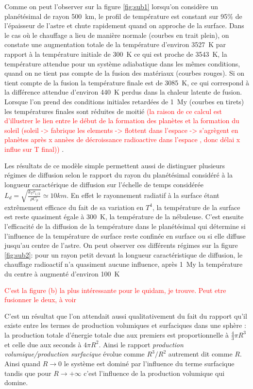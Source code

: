 \documentclass[10pt,a4paper]{article}
\numberwithin{equation}{section}
\begin{document}
Comme on peut l'observer sur la figure \ref{fig:sub1} lorsqu'on considère un planétésimal de rayon \SI{500}{km}, le profil de température est constant sur 95\% de l'épaisseur de l'astre et chute rapidement quand on approche de la surface. Dans le cas où le chauffage a lieu de manière normale (courbes en trait plein), on constate une augmentation totale de la température d'environ \SI{3527}{K} par rapport à la température initiale de \SI{300}{K} ce qui est proche de \SI{3543}{K}, la température attendue pour un système adiabatique dans les mêmes conditions, quand on ne tient pas compte de la fusion des matériaux (courbes rouges). Si on tient compte de la fusion la température finale est de \SI{3085}{K}, ce qui correspond à la différence attendue d'environ \SI{440}{K} perdus dans la chaleur latente de fusion. Lorsque l'on prend des conditions initiales retardées de \SI{1}{My} (courbes en tirets) les températures finales sont réduites de moitié \textcolor{red}{(la raison de ce calcul est d'illustrer le lien entre le début de la formation des planètes et la formation du soleil  (soleil -> fabrique les elements -> flottent dans l'espace  -> s'agrègent en planètes  après x annèes de décroissance radioactive dans l'espace , donc délai x influe sur T final))} .

Les résultats de ce modèle simple permettent aussi de distinguer plusieurs régimes de diffusion selon le rapport du rayon du planétésimal considéré à la longueur caractérique de diffusion sur l'échelle de temps considérée $L_d = \sqrt{\frac{k_T \tau_{1/2}}{\rho C_p}} \simeq 10 km$. En effet le rayonnement radiatif à la surface étant extrêmement efficace du fait de sa variation en $T^4$, la température de la surface est reste quasiment égale à \SI{300}{K}, la température de la nébuleuse. C'est ensuite l'efficacité de la diffusion de la température dans le planétésimal qui détermine si l'influence de la température de surface reste confinée en surface ou si elle diffuse jusqu'au centre de l'astre. On peut observer ces différents régimes sur la figure \ref{fig:sub2}: pour un rayon petit devant la longueur caractéristique de diffusion, le chauffage radioactif n'a quasiment aucune influence, après \SI{1}{My} la température du centre à augmenté d'environ \SI{100}{K}

\textcolor{red}{C'est la figure (b) la plus intéressante pour le quidam, je trouve. Peut etre fusionner le deux, à voir}

C'est un résultat que l'on attendait aussi qualitativement du fait du rapport qu'il existe entre les termes de production volumiques et surfaciques dans une sphère : la production totale d'énergie totale due aux premiers est proportionnelle à $\frac{4}{3} \pi R^3$ et celle due aux seconds à $4 \pi R^2$. Ainsi le rapport \textit{production volumique/production surfacique} évolue comme $R^3/R^2$ autrement dit comme $R$. Ainsi quand $R \rightarrow 0$ le système est dominé par l'influence du terme surfacique tandis que pour $R \rightarrow +\infty$ c'est l'influence de la production volumique qui domine.
\end{document}

